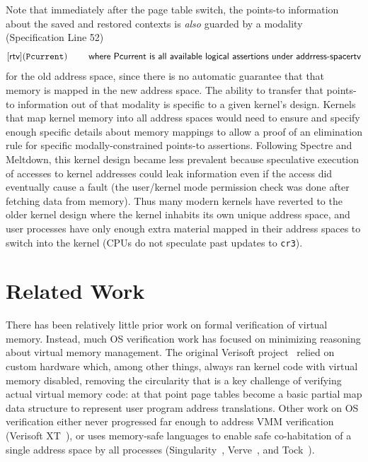 \documentclass[acmsmall,screen,nonacm]{acmart}
\begin{document}
Note that immediately after the page table switch, the points-to information about the saved and restored contexts is \emph{also} guarded by a modality (Specification Line 52)
\[ [\textsf{rtv}](\texttt{Pcurrent}) \qquad \textsf{ where Pcurrent is all available logical assertions under addrress-space} \textsf{rtv}\]
for the old address space, since there is no automatic guarantee that that memory is mapped in the new address space.  The ability to transfer that points-to information out of that modality is specific to a given kernel's design. Kernels that map kernel memory into all address spaces would need to ensure and specify enough specific details about memory mappings to allow a proof of an elimination rule for specific modally-constrained points-to assertions.
Following Spectre and Meltdown, this kernel design became less prevalent because speculative execution of accesses to kernel addresses could leak information even if the access did eventually cause a fault (the user/kernel mode permission check was done after fetching data from memory). Thus many modern kernels have reverted to the older kernel design where the kernel inhabits its own unique address space, and user processes have only enough extra material mapped in their address spaces to switch into the kernel (CPUs do not speculate past updates to \texttt{cr3}).

%
\section{Related Work}
\label{sec:relwork}

There has been relatively little prior work on formal verification of virtual memory.
Instead, much OS verification work has focused on minimizing reasoning about virtual memory management.
The original Verisoft project~\cite{alkassar2008verisoft,alkassar2010pervasive,alkassar2008formal,dalinger2005verification,hillebrand2005address,alkassar2008formal,starostin2010formal} relied on custom hardware which, among other things, always ran kernel code with virtual memory disabled, removing the circularity that is a key challenge of verifying actual virtual memory code: at that point page tables become a basic partial map data structure to represent user program address translations.
Other work on OS verification either never progressed far enough to address VMM verification (Verisoft XT~\cite{cohen2009vcc,cohen2010local,dahlweid2009vcc,cohen2013SOFSEM}), or uses memory-safe languages to enable safe co-habitation of a single address space by all processes (Singularity~\cite{Fahndrich2006language,Hunt2007singularity,Hunt2007sealing,Barnett2011specsharp}, Verve~\cite{Yang2010Verve}, and Tock~\cite{levy2017multiprogramming}).
\end{document}
